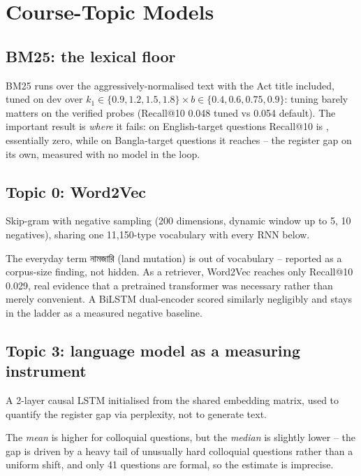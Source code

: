 \documentclass[10pt,a4paper]{article}
\newcommand{\bng}[1]{{\bn #1}}
\begin{document}
\section{Course-Topic Models}

\subsection{BM25: the lexical floor}
BM25 runs over the aggressively-normalised text with the Act title included, tuned on dev over $k_1\in\{0.9,1.2,1.5,1.8\}\times b\in\{0.4,0.6,0.75,0.9\}$: tuning barely matters on the verified probes (Recall@10 0.048 tuned vs 0.054 default). The important result is \emph{where} it fails: on English-target questions Recall@10 is \RtenBmEn, essentially zero, while on Bangla-target questions it reaches \RtenBmBn{} -- the register gap on its own, measured with no model in the loop.

\subsection{Topic 0: Word2Vec}
Skip-gram with negative sampling (200 dimensions, dynamic window up to 5, 10 negatives), sharing one 11{,}150-type vocabulary with every RNN below.

\begin{table}[H]
\centering

\caption{Nearest neighbours in the self-trained Word2Vec space.}
\end{table}

The everyday term \bng{নামজারি} (land mutation) is out of vocabulary -- reported as a corpus-size finding, not hidden. As a retriever, Word2Vec reaches only Recall@10 0.029, real evidence that a pretrained transformer was necessary rather than merely convenient. A BiLSTM dual-encoder scored similarly negligibly and stays in the ladder as a measured negative baseline.

\subsection{Topic 3: language model as a measuring instrument}
A 2-layer causal LSTM initialised from the shared embedding matrix, used to quantify the register gap via perplexity, not to generate text.

\begin{table}[H]
\centering

\caption{Perplexity of colloquial and formal gold questions.}
\end{table}
The \emph{mean} is higher for colloquial questions, but the \emph{median} is slightly lower -- the gap is driven by a heavy tail of unusually hard colloquial questions rather than a uniform shift, and only 41 questions are formal, so the estimate is imprecise.
\end{document}
